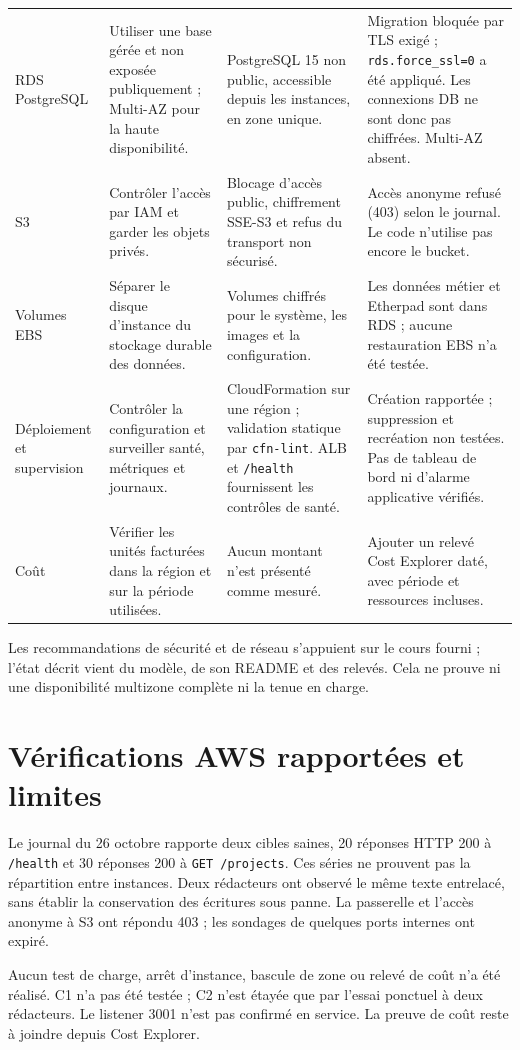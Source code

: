 \begin{longtable}{@{}L{22mm}@{\hspace{1mm}}L{31mm}@{\hspace{1mm}}L{50mm}@{\hspace{1mm}}L{51mm}@{}}
\addlinespace
RDS PostgreSQL & Utiliser une base gérée et non exposée publiquement ; Multi-AZ pour la haute disponibilité. \cite[p.~16, 88]{cours-aws} & PostgreSQL 15 non public, accessible depuis les instances, en zone unique. & Migration bloquée par TLS exigé ; \texttt{rds.force\_ssl=0} a été appliqué. Les connexions DB ne sont donc pas chiffrées. Multi-AZ absent. \\
\addlinespace
S3 & Contrôler l'accès par IAM et garder les objets privés. \cite[p.~73, 79--80]{cours-aws} & Blocage d'accès public, chiffrement SSE-S3 et refus du transport non sécurisé. & Accès anonyme refusé (403) selon le journal. Le code n'utilise pas encore le bucket. \\
\addlinespace
Volumes EBS & Séparer le disque d'instance du stockage durable des données. \cite[p.~59--60]{cours-aws} & Volumes chiffrés pour le système, les images et la configuration. & Les données métier et Etherpad sont dans RDS ; aucune restauration EBS n'a été testée. \\
\addlinespace
Déploiement et supervision & Contrôler la configuration et surveiller santé, métriques et journaux. \cite[p.~68, 107]{cours-aws} & CloudFormation sur une région ; validation statique par \texttt{cfn-lint}. ALB et \texttt{/health} fournissent les contrôles de santé. & Création rapportée ; suppression et recréation non testées. Pas de tableau de bord ni d'alarme applicative vérifiés. \\
\addlinespace
Coût & Vérifier les unités facturées dans la région et sur la période utilisées. \cite[p.~17, 22]{cours-aws} & Aucun montant n'est présenté comme mesuré. & Ajouter un relevé Cost Explorer daté, avec période et ressources incluses. \\
\bottomrule
\end{longtable}
\endgroup

Les recommandations de sécurité et de réseau s'appuient sur le cours fourni ; l'état décrit vient du modèle, de son README et des relevés. Cela ne prouve ni une disponibilité multizone complète ni la tenue en charge.
\section{Vérifications AWS rapportées et limites}

Le journal du 26 octobre rapporte deux cibles saines, 20 réponses HTTP 200 à \texttt{/health} et 30 réponses 200 à \texttt{GET /projects}. Ces séries ne prouvent pas la répartition entre instances. Deux rédacteurs ont observé le même texte entrelacé, sans établir la conservation des écritures sous panne. La passerelle et l'accès anonyme à S3 ont répondu 403 ; les sondages de quelques ports internes ont expiré. \cite{aws-test-records}

Aucun test de charge, arrêt d'instance, bascule de zone ou relevé de coût n'a été réalisé. C1 n'a pas été testée ; C2 n'est étayée que par l'essai ponctuel à deux rédacteurs. Le listener 3001 n'est pas confirmé en service. La preuve de coût reste à joindre depuis Cost Explorer.
